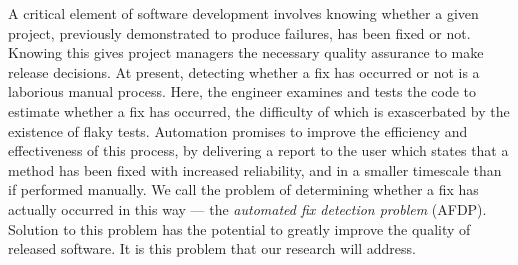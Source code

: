 
A critical element of software development involves knowing whether a given project, previously demonstrated to produce failures, has been fixed or not. Knowing this gives project managers the necessary quality assurance to make release decisions. 
At present, detecting whether a fix has occurred or not is a laborious manual process. Here, the engineer examines and tests the code to estimate whether a fix has occurred, the difficulty of which is exascerbated by the existence of flaky tests. Automation promises to improve the efficiency and effectiveness of this process, by delivering a report to the user which states that a method has been fixed with increased reliability, and in a smaller timescale than if performed manually. We call the problem of determining whether a fix has actually occurred in this way --- the \textit{automated fix detection problem} (AFDP). Solution to this problem has the potential to greatly improve the quality of released software. It is this problem that our research will address. 

